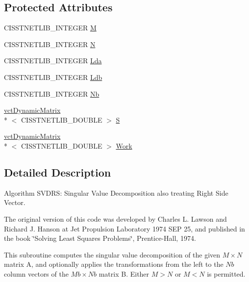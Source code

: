 \subsection*{Protected Attributes}
\begin{DoxyCompactItemize}
\item 
C\-I\-S\-S\-T\-N\-E\-T\-L\-I\-B\-\_\-\-I\-N\-T\-E\-G\-E\-R \hyperlink{classnmr_s_v_d_r_s_solver_ac96d6c9453bc57e859533512ab2022a3}{M}
\item 
C\-I\-S\-S\-T\-N\-E\-T\-L\-I\-B\-\_\-\-I\-N\-T\-E\-G\-E\-R \hyperlink{classnmr_s_v_d_r_s_solver_acf36506705c504c2d35e3c831dfe4871}{N}
\item 
C\-I\-S\-S\-T\-N\-E\-T\-L\-I\-B\-\_\-\-I\-N\-T\-E\-G\-E\-R \hyperlink{classnmr_s_v_d_r_s_solver_aa80a92f8293e49713e6d8f750ba7b774}{Lda}
\item 
C\-I\-S\-S\-T\-N\-E\-T\-L\-I\-B\-\_\-\-I\-N\-T\-E\-G\-E\-R \hyperlink{classnmr_s_v_d_r_s_solver_a4447d227e273f88a53834901df316b95}{Ldb}
\item 
C\-I\-S\-S\-T\-N\-E\-T\-L\-I\-B\-\_\-\-I\-N\-T\-E\-G\-E\-R \hyperlink{classnmr_s_v_d_r_s_solver_a2f397a32b6791b9eb438158f6b620cb5}{Nb}
\item 
\hyperlink{classvct_dynamic_matrix}{vct\-Dynamic\-Matrix}\\*
$<$ C\-I\-S\-S\-T\-N\-E\-T\-L\-I\-B\-\_\-\-D\-O\-U\-B\-L\-E $>$ \hyperlink{classnmr_s_v_d_r_s_solver_a7ec50f8b0ef442501f1c0b866f337474}{S}
\item 
\hyperlink{classvct_dynamic_matrix}{vct\-Dynamic\-Matrix}\\*
$<$ C\-I\-S\-S\-T\-N\-E\-T\-L\-I\-B\-\_\-\-D\-O\-U\-B\-L\-E $>$ \hyperlink{classnmr_s_v_d_r_s_solver_a96c3cc87d1659d99563064e240d5d087}{Work}
\end{DoxyCompactItemize}


\subsection{Detailed Description}
Algorithm S\-V\-D\-R\-S\-: Singular Value Decomposition also treating Right Side Vector.

The original version of this code was developed by Charles L. Lawson and Richard J. Hanson at Jet Propulsion Laboratory 1974 S\-E\-P 25, and published in the book \char`\"{}\-Solving Least Squares Problems\char`\"{}, Prentice-\/\-Hall, 1974.

This subroutine computes the singular value decomposition of the given $ M \times N $ matrix A, and optionally applies the transformations from the left to the $ Nb $ column vectors of the $ Mb \times Nb $ matrix B. Either $ M > N $ or $ M < N $ is permitted.

